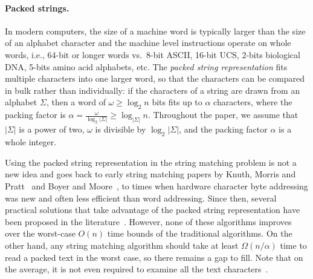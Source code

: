 \documentclass[12pt]{article}
\newcommand{\W}{{\omega}}
\newcommand{\C}{{\alpha}}
\begin{document}
\paragraph{Packed strings.} In modern computers, the size of a machine word 
is typically larger than the size of an alphabet character 
 and the machine level instructions operate on whole words,
i.e., 64-bit or longer words 
vs.~8-bit ASCII, 16-bit UCS, 2-bits biological DNA, 
5-bits amino acid alphabets, etc.
The {\em packed string representation} fits multiple characters into one larger
word, so that the characters can be compared in bulk rather 
than individually: 
if the characters of a string are drawn from an alphabet $\Sigma$, then a
word of $\W \geq \log_2 n$ bits fits up to $\C$ characters, where the packing factor
is $\C=\frac{\W}{\log_2 |\Sigma|} \geq \log_{|\Sigma|} n$.
Throughout the paper, we assume that 
$|\Sigma|$ is a power of two, 
$\W$ is divisible by $\log_2 |\Sigma|$, and 
the packing factor $\C$ is a whole integer.


Using the packed string representation in the string matching problem
is not a new idea and %
goes back to early string matching papers by Knuth, Morris and
Pratt~\cite[\S 4]{kmp:77} and Boyer and Moore~\cite[\S 8-9]{bm:77},
to times when hardware 
character byte addressing was new and 
often less efficient than word addressing.
Since then, several practical solutions that take advantage of the
packed string representation have been proposed in the
literature~\cite{baezayates:1989,kbn:2007,fl:2009,fredriksson:2002,fredriksson:2003,nr:98,tp:1997}.
However, none of these algorithms improves over the worst-case $O(n)$
time bounds of the traditional algorithms. On the other hand, any string
matching algorithm should take at least $\Omega(n/\C)$ time  to read a packed
text in the worst case, so there remains a gap to fill.
Note that on the average, 
it is not even required to examine all the text characters~\cite{bm:77,yao:79}.
\end{document}
